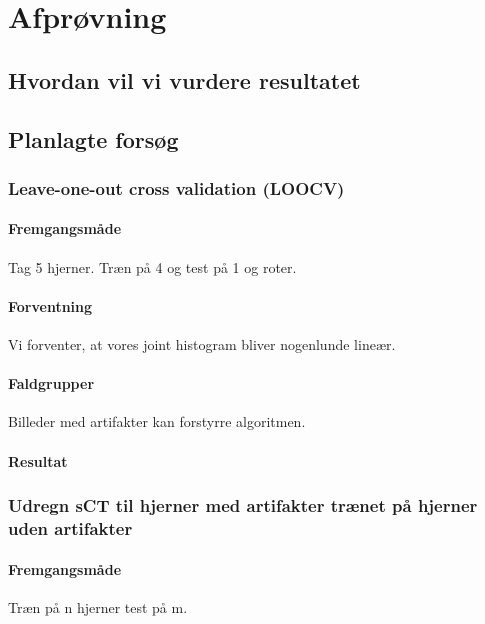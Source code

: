 \section{Afprøvning}

\subsection{Hvordan vil vi vurdere resultatet}


\subsection{Planlagte forsøg}

\subsubsection{Leave-one-out cross validation (LOOCV)}
\paragraph   {Fremgangsmåde}
Tag 5 hjerner. Træn på 4 og test på 1 og roter.


\paragraph   {Forventning}
Vi forventer, at vores joint histogram bliver nogenlunde lineær. 

\paragraph   {Faldgrupper}
Billeder med artifakter kan forstyrre algoritmen. 

\paragraph   {Resultat}

\subsubsection{Udregn sCT til hjerner med artifakter trænet på hjerner uden artifakter}
\paragraph   {Fremgangsmåde}
Træn på n hjerner test på m.

